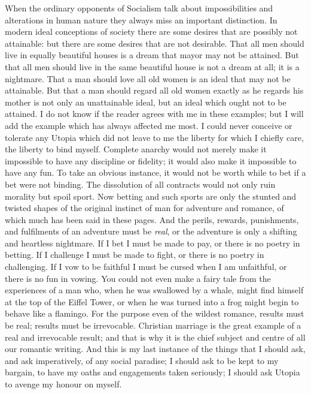\documentclass{book}
\begin{document}
When the ordinary opponents of Socialism talk about impossibilities and alterations in human nature they always miss an important distinction. In modern ideal conceptions of society there are some desires that are possibly not attainable: but there are some desires that are not desirable. That all men should live in equally beautiful houses is a dream that mayor may not be attained. But that all men should live in the same beautiful house is not a dream at all; it is a nightmare. That a man should love all old women is an ideal that may not be attainable. But that a man should regard all old women exactly as he regards his mother is not only an unattainable ideal, but an ideal which ought not to be attained. I do not know if the reader agrees with me in these examples; but I will add the example which has always affected me most. I could never conceive or tolerate any Utopia which did not leave to me the liberty for which I chiefly care, the liberty to bind myself. Complete anarchy would not merely make it impossible to have any discipline or fidelity; it would also make it impossible to have any fun. To take an obvious instance, it would not be worth while to bet if a bet were not binding. The dissolution of all contracts would not only ruin morality but spoil sport. Now betting and such sports are only the stunted and twisted shapes of the original instinct of man for adventure and romance, of which much has been said in these pages. And the perils, rewards, punishments, and fulfilments of an adventure must be \emph{real}, or the adventure is only a shifting and heartless nightmare. If I bet I must be made to pay, or there is no poetry in betting. If I challenge I must be made to fight, or there is no poetry in challenging. If I vow to be faithful I must be cursed when I am unfaithful, or there is no fun in vowing. You could not even make a fairy tale from the experiences of a man who, when he was swallowed by a whale, might find himself at the top of the Eiffel Tower, or when he was turned into a frog might begin to behave like a flamingo. For the purpose even of the wildest romance, results must be real; results must be irrevocable. Christian marriage is the great example of a real and irrevocable result; and that is why it is the chief subject and centre of all our romantic writing. And this is my last instance of the things that I should ask, and ask imperatively, of any social paradise; I should ask to be kept to my bargain, to have my oaths and engagements taken seriously; I should ask Utopia to avenge my honour on myself.
\end{document}

